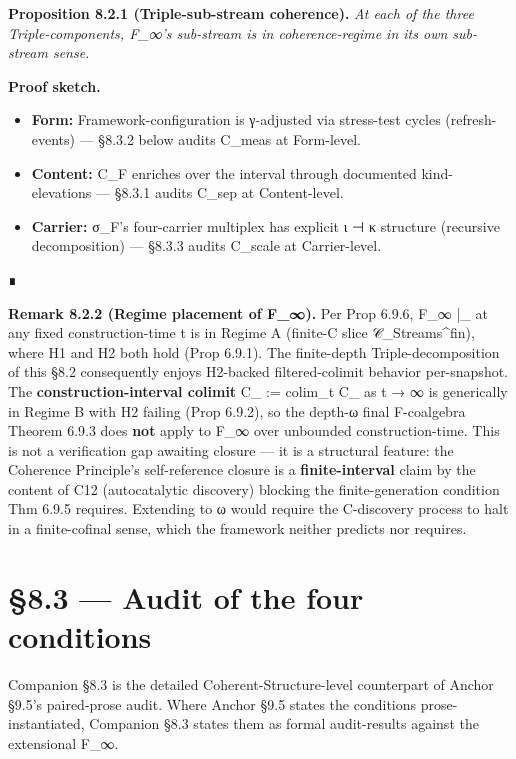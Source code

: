 \documentclass[11pt, openany]{book}
\newcommand{\sectionbreak}{\clearpage}
\begin{document}
\textbf{Proposition 8.2.1 (Triple-sub-stream coherence).} \textit{At each of the three Triple-components, F\_\allowbreak{}∞'s sub-stream is in coherence-regime in its own sub-stream sense.}

\textbf{Proof sketch.}
\begin{itemize}
\item \textbf{Form:} Framework-configuration is γ-adjusted via stress-test cycles (refresh-events) --- §8.3.2 below audits C\_\allowbreak{}meas at Form-level.
\item \textbf{Content:} C\_\allowbreak{}F enriches over the interval through documented kind-elevations --- §8.3.1 audits C\_\allowbreak{}sep at Content-level.
\item \textbf{Carrier:} σ\_\allowbreak{}F's four-carrier multiplex has explicit ι ⊣ κ structure (recursive decomposition) --- §8.3.3 audits C\_\allowbreak{}scale at Carrier-level.
\end{itemize}
∎

\textbf{Remark 8.2.2 (Regime placement of F\_\allowbreak{}∞).} Per Prop 6.9.6, F\_\allowbreak{}∞ |\_ at any fixed construction-time t is in Regime A (finite-C slice 𝒞\_\allowbreak{}Streams\textasciicircum{}{fin}), where H1 and H2 both hold (Prop 6.9.1). The finite-depth Triple-decomposition of this §8.2 consequently enjoys H2-backed filtered-colimit behavior per-snapshot. The \textbf{construction-interval colimit} C\_ := colim\_\allowbreak{}t C\_ as t → ∞ is generically in Regime B with H2 failing (Prop 6.9.2), so the depth-ω final F-coalgebra Theorem 6.9.3 does \textbf{not} apply to F\_\allowbreak{}∞ over unbounded construction-time. This is not a verification gap awaiting closure --- it is a structural feature: the Coherence Principle's self-reference closure is a \textbf{finite-interval} claim by the content of C12 (autocatalytic discovery) blocking the finite-generation condition Thm 6.9.5 requires. Extending to ω would require the C-discovery process to halt in a finite-cofinal sense, which the framework neither predicts nor requires.

\sectionbreak

\section{§8.3 --- Audit of the four conditions}

Companion §8.3 is the detailed Coherent-Structure-level counterpart of Anchor §9.5's paired-prose audit. Where Anchor §9.5 states the conditions prose-instantiated, Companion §8.3 states them as formal audit-results against the extensional F\_\allowbreak{}∞.
\end{document}
